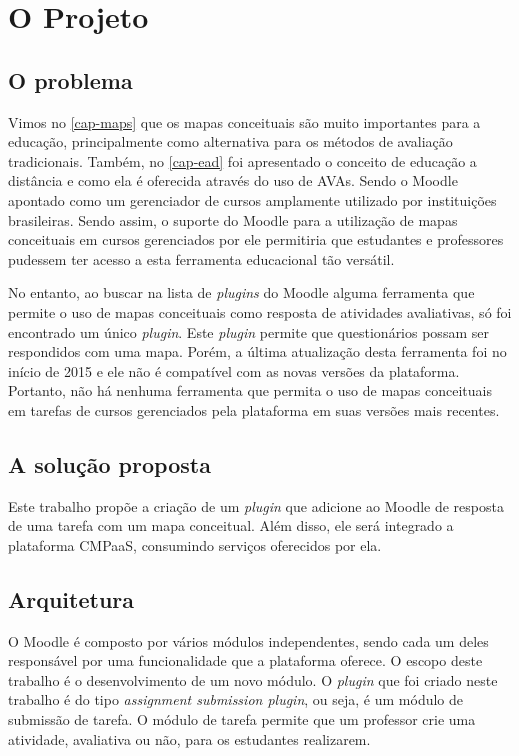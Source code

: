 \documentclass[
	12pt,				%
	openright,			%
	oneside,			%
	a4paper,			%
	english,			%
	french,				%
	spanish,			%
	brazil				%
	]{abntex2}
\begin{document}
 

\chapter{O Projeto}\label{cap-projeto}

\section{O problema}

Vimos no \autoref{cap-maps} que os mapas conceituais são muito importantes para a educação, principalmente como alternativa para os métodos de avaliação tradicionais. Também, no \autoref{cap-ead} foi apresentado o conceito de educação a distância e como ela é oferecida através do uso de AVAs. Sendo o Moodle apontado como um gerenciador de cursos amplamente utilizado por instituições brasileiras. Sendo assim, o suporte do Moodle para a utilização de mapas conceituais em cursos gerenciados por ele permitiria que estudantes e professores pudessem ter acesso a esta ferramenta educacional tão versátil.    

No entanto, ao buscar na lista de \textit{plugins} do Moodle alguma ferramenta que permite o uso de mapas conceituais como resposta de atividades avaliativas, só foi encontrado um único \textit{plugin}. Este \textit{plugin} permite que questionários possam ser respondidos com uma mapa. Porém, a última atualização desta ferramenta foi no início de 2015 e ele não é compatível com as novas versões da plataforma. Portanto, não há nenhuma ferramenta que permita o uso de mapas conceituais em tarefas de cursos gerenciados pela plataforma em suas versões mais recentes.


\section{A solução proposta}

Este trabalho propõe a criação de um \textit{plugin} que adicione ao Moodle de resposta de uma tarefa com um mapa conceitual. Além disso, ele será integrado a plataforma CMPaaS, consumindo serviços oferecidos por ela.

\section{Arquitetura}

O Moodle é composto por vários módulos independentes, sendo cada um deles responsável por uma funcionalidade que a plataforma oferece. O escopo deste trabalho é o desenvolvimento de um novo módulo. O \textit{plugin} que foi criado neste trabalho é do tipo \textit{assignment submission plugin}, ou seja, é um módulo de submissão de tarefa. O módulo de tarefa permite que um professor crie uma atividade, avaliativa ou não, para os estudantes realizarem.
\end{document}
